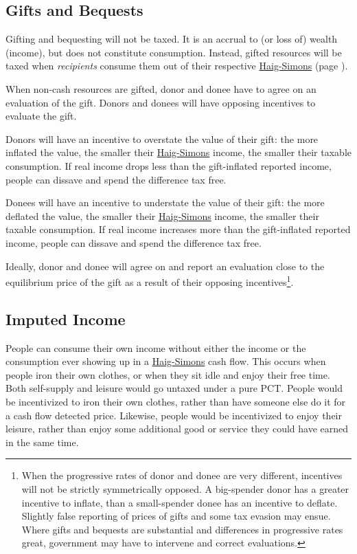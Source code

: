 \subsection{Gifts and Bequests} Gifting and bequesting will not be taxed. It is an accrual to (or loss of) wealth (income), but does not constitute consumption. Instead, gifted resources will be taxed when \emph{recipients} consume them out of their respective \hyperref[eq:HaigSimonsPCT]{Haig-Simons} (page \pageref{eq:HaigSimonsPCT}). 

When non-cash resources are gifted, donor and donee have to agree on an evaluation of the gift. Donors and donees will have opposing incentives to evaluate the gift.

Donors will have an incentive to overstate the value of their gift: the more inflated the value, the smaller their \hyperref[eq:HaigSimonsPCT]{Haig-Simons} income, the smaller their taxable consumption. If real income drops less than the gift-inflated reported income, people can dissave and spend the difference tax free.

Donees will have an incentive to understate the value of their gift: the more deflated the value, the smaller their \hyperref[eq:HaigSimonsPCT]{Haig-Simons} income, the smaller their taxable consumption. If real income increases more than the gift-inflated reported income, people can dissave and spend the difference tax free.

Ideally, donor and donee will agree on and report an evaluation close to the equilibrium price of the gift as a result of their opposing incentives\footnote{
	When the progressive rates of donor and donee are very different, incentives will not be strictly symmetrically opposed. A big-spender donor has a greater incentive to inflate, than a small-spender donee has an incentive to deflate. Slightly false reporting of prices of gifts and some tax evasion may ensue. Where gifts and bequests are substantial and differences in progressive rates great, government may have to intervene and correct evaluations.}.

\subsection{Imputed Income} People can consume their own income without either the income or the consumption ever showing up in a \hyperref[eq:HaigSimonsPCT]{Haig-Simons} cash flow. This occurs when people iron their own clothes, or when they sit idle and enjoy their free time. Both self-supply and leisure would go untaxed under a pure PCT. People would be incentivized to iron their own clothes, rather than have someone else do it for a cash flow detected price. Likewise, people would be incentivized to enjoy their leisure, rather than enjoy some additional good or service they could have earned in the same time.

